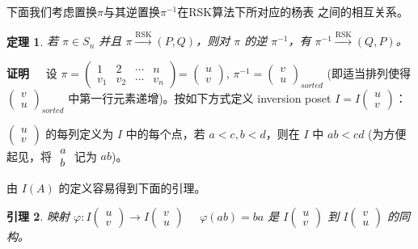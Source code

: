 \documentclass[a4paper,11pt]{article}
\newtheorem{thm}{定理}[section]
\newtheorem{lem}[thm]{引理}
\def\pf{{\bf 证明~~ }}
\begin{document}
下面我们考虑置换$\pi$与其逆置换$\pi^{-1 }$在RSK算法下所对应的杨表
之间的相互关系。


\begin{thm} 若 $\pi\in S_n$ 并且
$\pi\xrightarrow{\text{RSK}}(P, Q)$，则对 $\pi$ 的逆 $\pi^{-1 }$，有
$\pi^{-1 }\xrightarrow{\text{RSK}}(Q, P)$。
\end{thm}

\pf 设 $\pi=\left(\begin{array}{cccc}
1&2&\cdots&n\\v_1&v_2&\cdots&v_n\end{array}\right)$=
$\left(\begin{array}{c}
u\\v\end{array}\right)$, $\pi^{-1 }=\left(\begin{array}{c}
v\\u\end{array}\right)_{sorted}$ (即适当排列使得
$\left(\begin{array}{c} v\\u\end{array}\right)_{sorted}$
中第一行元素递增)。按如下方式定义 inversion poset
$I=I\left(\begin{array}{c} u\\v\end{array}\right)$：

$\left(\begin{array}{c} u\\v\end{array}\right)$ 的每列定义为 $I$
中的每个点，若 $a<c, b<d$，则在 $I$ 中 $ab<cd$ (为方便起见，将
$\begin{array}{c} a\\b\end{array}$ 记为 $ab$)。

由 $I(A)$ 的定义容易得到下面的引理。


\begin{lem}  映射 $\varphi: I\left(\begin{array}{c}
u\\v\end{array}\right)\rightarrow I\left(\begin{array}{c}
v\\u\end{array}\right)$ \ \ $\varphi(ab)=ba$ 是
$I\left(\begin{array}{c} u\\v\end{array}\right)$ 到
$I\left(\begin{array}{c} v\\u\end{array}\right)$ 的同构。\end{lem}
\end{document}
